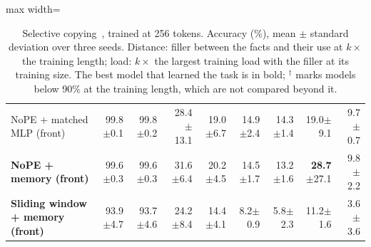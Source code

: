 \begin{table}
\begin{adjustbox}{max width=\linewidth}
\begin{tabular}{lrrrrrrrr}
NoPE + matched MLP (front) & 99.8{\scriptsize$\pm$0.1} & 99.8{\scriptsize$\pm$0.2} & 28.4{\scriptsize$\pm$13.1} & 19.0{\scriptsize$\pm$6.7} & 14.9{\scriptsize$\pm$2.4} & 14.3{\scriptsize$\pm$1.4} & 19.0{\scriptsize$\pm$9.1} & 9.7{\scriptsize$\pm$0.7} \\
\textbf{NoPE + memory (front)} & 99.6{\scriptsize$\pm$0.3} & 99.6{\scriptsize$\pm$0.3} & 31.6{\scriptsize$\pm$6.4} & 20.2{\scriptsize$\pm$4.5} & 14.5{\scriptsize$\pm$1.7} & 13.2{\scriptsize$\pm$1.6} & \textbf{28.7}{\scriptsize$\pm$27.1} & 9.8{\scriptsize$\pm$2.2} \\
\textbf{Sliding window + memory (front)} & 93.9{\scriptsize$\pm$4.7} & 93.7{\scriptsize$\pm$4.6} & 24.2{\scriptsize$\pm$8.4} & 14.4{\scriptsize$\pm$4.1} & 8.2{\scriptsize$\pm$0.9} & 5.8{\scriptsize$\pm$2.3} & 11.2{\scriptsize$\pm$1.6} & 3.6{\scriptsize$\pm$3.6} \\
\bottomrule
\end{tabular}
\end{adjustbox}
\caption{Selective copying~\citep{gu2023mamba}, trained at 256 tokens. Accuracy (\%), mean $\pm$ standard deviation over three seeds. Distance: filler between the facts and their use at $k\times$ the training length; load: $k\times$ the largest training load with the filler at its training size. The best model that learned the task is in bold; $^\dagger$ marks models below 90\% at the training length, which are not compared beyond it.}
\label{tab:selcopy}
\end{table}
